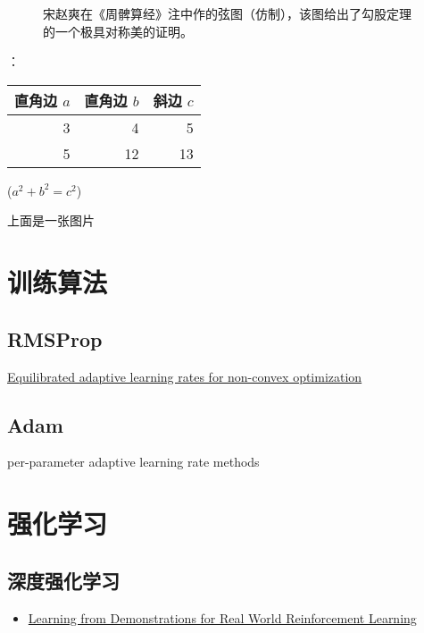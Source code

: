 \documentclass[UTF8,11pt,a4paper]{ctexart}
\begin{document}
\begin{figure}[ht]
\centering
\caption{宋赵爽在《周髀算经》注中作的弦图（仿制），该图给出了勾股定理的一个极具对称美的证明。} 
\label{fig:cnn}
\end{figure}：

\begin{table}[H]
\begin{tabular}{|rrr|}
\hline
直角边 $a$ & 直角边 $b$ & 斜边 $c$\\
\hline
3 & 4 & 5 \\
5 & 12 & 13 \\
\hline
\end{tabular}%
\qquad
($a^2 + b^2 = c^2$)
\end{table}

上面是一张图片

\section{训练算法}

\subsection{RMSProp}
\href{https://arxiv.org/abs/1502.04390}{Equilibrated adaptive learning rates for non-convex optimization}

\subsection{Adam}
per-parameter adaptive learning rate methods


\section{强化学习}

\subsection{深度强化学习}
\begin{itemize}
\item \href{https://arxiv.org/pdf/1704.03732.pdf}{Learning from Demonstrations for Real World Reinforcement Learning}
\end{itemize}
\end{document}
